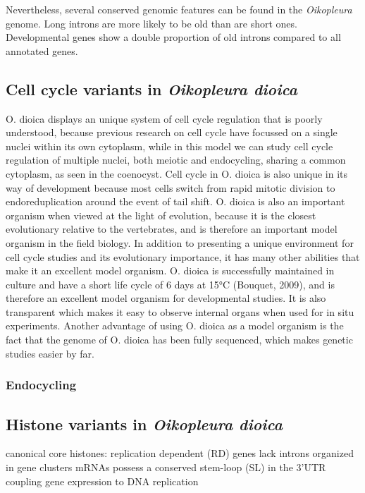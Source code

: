 \documentclass[11pt,twoside,a4paper]{report}
\begin{document}
		Nevertheless, several conserved genomic features can be found in the \textit{Oikopleura} genome.
		Long introns are more likely to be old than are short ones.
		Developmental genes show a double proportion of old introns compared to all annotated genes.
		

		\subsection{Cell cycle variants in \textit{Oikopleura dioica}}
		\label{subsection:CellCycleVariants}
		O. dioica displays an unique system of cell cycle regulation that is poorly understood, because previous research on cell cycle have focussed on a single nuclei within its own cytoplasm, while in this model we can study cell cycle regulation of multiple nuclei, both meiotic and endocycling, sharing a common cytoplasm, as seen in the coenocyst. Cell cycle in O. dioica is also unique in its way of development because most cells switch from rapid mitotic division to endoreduplication around the event of tail shift. O. dioica is also an important organism when viewed at the light of evolution, because it is the closest evolutionary relative to the vertebrates, and is therefore an important model organism in the field biology. In addition to presenting a unique environment for cell cycle studies and its evolutionary importance, it has many other abilities that make it an excellent model organism. O. dioica is successfully maintained in culture and have a short life cycle of 6 days at 15°C (Bouquet, 2009), and is therefore an excellent model organism for developmental studies. It is also transparent which makes it easy to observe internal organs when used for in situ experiments. Another advantage of using O. dioica as a model organism is the fact that the genome of O. dioica has been fully sequenced, which makes genetic studies easier by far.
		
			\subsubsection{Endocycling}
		
		\subsection{Histone variants in \textit{Oikopleura dioica}}
		\cite{Moosmann2011}

canonical core histones:
	replication dependent (RD) genes
	lack introns
	organized in gene clusters
	mRNAs possess a conserved stem-loop (SL) in the 3’UTR coupling gene expression to DNA replication
\end{document}
